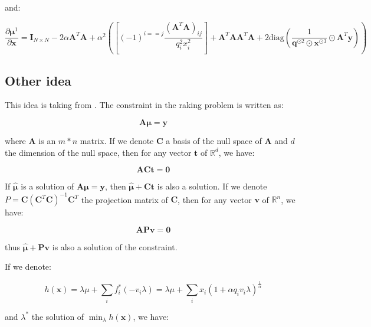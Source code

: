 \documentclass{tex/note}
\begin{document}
and:

\begin{equation*}
\frac{\partial \bm{\mu}^1}{\partial \bm{x}} = \bm{I}_{N \times N} - 2 \alpha \bm{A}^T \bm{A} + \alpha^2 \left( \left[ \left( -1 \right)^{i == j} \frac{ \left( \bm{A}^T \bm{A} \right)_{ij}}{q_i^2 x_i^2} \right] + \bm{A}^T \bm{A} \bm{A}^T \bm{A} + 2 \text{diag} \left( \frac{1}{\bm{q}^{\odot 2} \odot \bm{x}^{\odot 3}} \odot \bm{A}^T \bm{y} \right) \right)
\end{equation*}

\subsection{Other idea}

This idea is taking from \cite{SI_2023}. The constraint in the raking problem is written as:

\begin{equation*}
\bm{A} \bm{\mu} = \bm{y}
\end{equation*}

where $\bm{A}$ is an $m * n$ matrix. If we denote $\bm{C}$ a basis of the null space of $\bm{A}$ and $d$ the dimension of the null space, then for any vector $\bm{t}$ of $\mathbb{R}^d$, we have:

\begin{equation*}
\bm{A} \bm{C} \bm{t} = \bm{0}
\end{equation*}

If $\hat{\bm{\mu}}$ is a solution of $\bm{A} \bm{\mu} = \bm{y}$, then $\hat{\bm{\mu}} + \bm{C} \bm{t}$ is also a solution. If we denote $P = \bm{C} \left( \bm{C}^T \bm{C} \right) ^{-1} \bm{C}^T$ the projection matrix of $\bm{C}$, then for any vector $\bm{v}$ of $\mathbb{R}^n$, we have:

\begin{equation*}
\bm{A} \bm{P} \bm{v} = \bm{0}
\end{equation*}

thus $\hat{\bm{\mu}} + \bm{P} \bm{v}$ is also a solution of the constraint.

If we denote:

\begin{equation*}
h \left( \bm{x} \right) = \lambda \mu + \sum_i f_i^* \left( - v_i \lambda \right) = \lambda \mu + \sum_i x_i \left( 1 + \alpha q_i v_i \lambda \right) ^{\frac{1}{\alpha}}
\end{equation*}

and $\lambda^*$ the solution of $\min_{\lambda} h \left( \bm{x} \right)$, we have:
\end{document}
